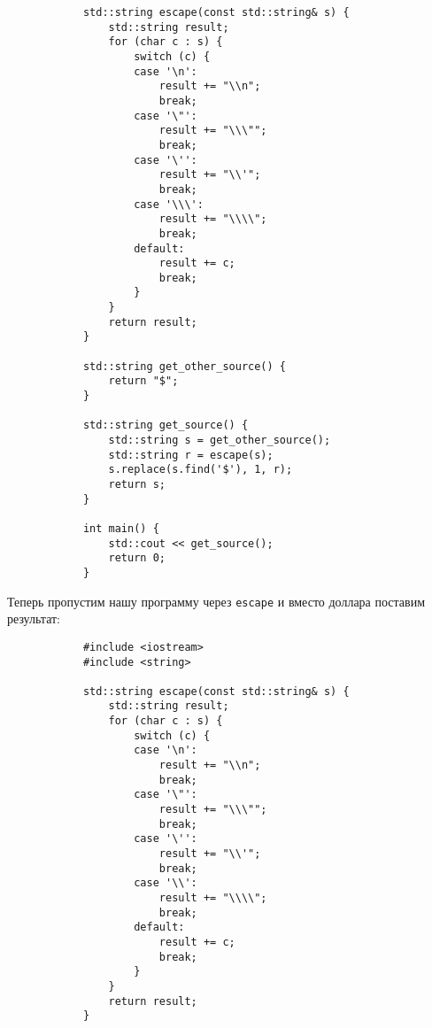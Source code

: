 \documentclass{article}
\begin{document}
\begin{remark}
\begin{verbatim}
            std::string escape(const std::string& s) {
                std::string result;
                for (char c : s) {
                    switch (c) {
                    case '\n':
                        result += "\\n";
                        break;
                    case '\"':
                        result += "\\\"";
                        break;
                    case '\'':
                        result += "\\'";
                        break;
                    case '\\\':
                        result += "\\\\";
                        break;
                    default:
                        result += c;
                        break;
                    }
                }
                return result;
            }
            
            std::string get_other_source() {
                return "$";
            }
            
            std::string get_source() {
                std::string s = get_other_source();
                std::string r = escape(s);
                s.replace(s.find('$'), 1, r);
                return s;
            }
            
            int main() {
                std::cout << get_source();
                return 0;
            }
        \end{verbatim}
        Теперь пропустим нашу программу через \Verb|escape| и вместо доллара поставим результат:
        \begin{verbatim}
            #include <iostream>
            #include <string>
            
            std::string escape(const std::string& s) {
                std::string result;
                for (char c : s) {
                    switch (c) {
                    case '\n':
                        result += "\\n";
                        break;
                    case '\"':
                        result += "\\\"";
                        break;
                    case '\'':
                        result += "\\'";
                        break;
                    case '\\':
                        result += "\\\\";
                        break;
                    default:
                        result += c;
                        break;
                    }
                }
                return result;
            }
            

\end{verbatim}
\end{remark}
\end{document}
